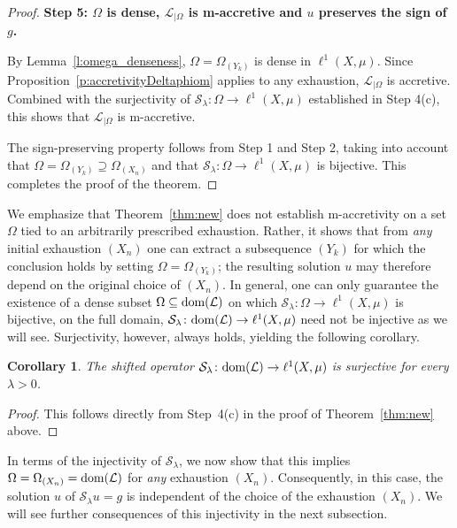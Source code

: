 \documentclass[letterpaper]{article}
\newtheorem{corollary}[lemma]{Corollary}
\theoremstyle{definition}
\theoremstyle{named}
\numberwithin{equation}{section}
\newcommand{\dom}{\textnormal{dom}} %
\newcommand{\Deltaphi}{\mathcal{L}}
\newcommand{\Deltaphiom}{\Deltaphi_{|\Omega}}
\begin{document}
\begin{proof}
\medskip
\noindent
\textbf{Step 5: $\Omega$ is dense, $\Deltaphiom$ is m-accretive and $u$ preserves the sign of $g$.}

By Lemma~\ref{l:omega_denseness}, $\Omega = \Omega_{(Y_k)}$ 
is dense in $\ell^1(X,\mu)$. 
Since Proposition~\ref{p:accretivityDeltaphiom} applies to any exhaustion, $\Deltaphi_{|\Omega}$ is accretive. Combined with the surjectivity of $\mathcal{S}_\lambda \colon \Omega \to \ell^1(X,\mu)$ established in Step 4(c), this shows that $\Deltaphi_{|\Omega}$ is m-accretive.

The sign-preserving property follows from Step 1 and Step 2, taking into account that $\Omega = \Omega_{(Y_k)}\supseteq \Omega_{(X_n)}$ and that $\mathcal{S}_\lambda \colon \Omega \to \ell^1(X,\mu)$ is bijective.  This completes the proof of the theorem.
\end{proof}

We emphasize that Theorem~\ref{thm:new} does not establish m-accretivity on a set
$\Omega$ tied to an arbitrarily prescribed exhaustion. Rather, it shows that from \emph{any}
initial exhaustion $(X_n)$ one can extract a subsequence $(Y_k)$ for which the
conclusion holds by setting $\Omega = \Omega_{(Y_k)}$;
the resulting solution $u$ may therefore depend on the original choice of
$(X_n)$. In general, one can only guarantee the existence of a dense subset
$\Omega \subseteq \dom(\Deltaphi)$ on which $\mathcal{S}_\lambda \colon \Omega \to
\ell^1(X,\mu)$ is bijective, on the full domain, $\mathcal{S}_\lambda \colon
\dom(\Deltaphi) \to \ell^1(X,\mu)$ need not be injective as we will see. Surjectivity, however, always
holds, yielding the following corollary.
\begin{corollary}\label{cor:S_lambda_surjectivity}
The shifted operator $\mathcal{S}_{\lambda} \colon \dom(\Deltaphi) \to \ell^1(X,\mu)$ is
surjective for every $\lambda >0$.
\end{corollary}
\begin{proof}
    This follows directly from Step~4(c) in the proof of Theorem~\ref{thm:new} above.
\end{proof}

In terms of the injectivity of  $\mathcal{S}_{\lambda}$, we now show that
this implies $\Omega = \Omega_{(X_n)} = \dom(\Deltaphi)$ for \emph{any} exhaustion $(X_n)$. 
Consequently, in this case, the solution $u$ of $\mathcal{S}_\lambda u=g$ is independent of  the choice of the exhaustion $(X_n)$.
We will see further consequences of this injectivity in the next subsection.
\end{document}
